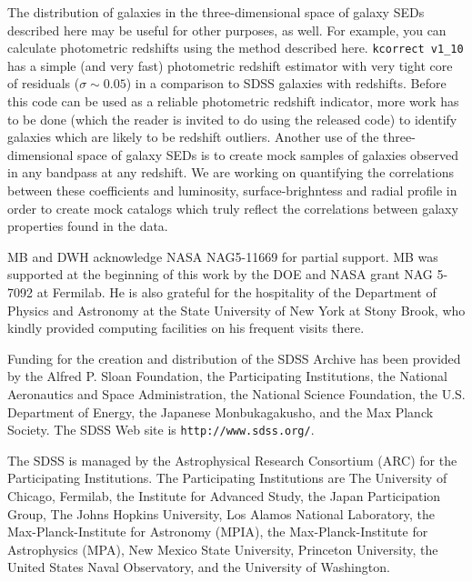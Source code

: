 \documentclass[10pt,preprint]{aastex}
\newcommand{\kversion}{{\tt v1\_10}}
\begin{document}
The distribution of galaxies in the three-dimensional space of galaxy
SEDs described here may be useful for other purposes, as well. For
example, you can calculate photometric redshifts using the method
described here. {\tt kcorrect \kversion} has a simple (and very fast)
photometric redshift estimator with very tight core of residuals
($\sigma \sim 0.05$) in a comparison to SDSS galaxies with redshifts.
Before this code can be used as a reliable photometric redshift
indicator, more work has to be done (which the reader is invited to do
using the released code) to identify galaxies which are likely to be
redshift outliers. Another use of the three-dimensional space of
galaxy SEDs is to create mock samples of galaxies observed in any
bandpass at any redshift. We are working on quantifying the
correlations between these coefficients and luminosity,
surface-brighntess and radial profile in order to create mock catalogs
which truly reflect the correlations between galaxy properties found
in the data. 

\acknowledgments

MB and DWH acknowledge NASA NAG5-11669 for partial support.  MB was
supported at the beginning of this work by the DOE and NASA grant NAG
5-7092 at Fermilab. He is also grateful for the hospitality of the
Department of Physics and Astronomy at the State University of New
York at Stony Brook, who kindly provided computing facilities on his
frequent visits there.

Funding for the creation and distribution of the SDSS Archive has been
provided by the Alfred P. Sloan Foundation, the Participating
Institutions, the National Aeronautics and Space Administration, the
National Science Foundation, the U.S. Department of Energy, the
Japanese Monbukagakusho, and the Max Planck Society. The SDSS Web site
is {\tt http://www.sdss.org/}.

The SDSS is managed by the Astrophysical Research Consortium (ARC) for
the Participating Institutions. The Participating Institutions are The
University of Chicago, Fermilab, the Institute for Advanced Study, the
Japan Participation Group, The Johns Hopkins University, Los Alamos
National Laboratory, the Max-Planck-Institute for Astronomy (MPIA),
the Max-Planck-Institute for Astrophysics (MPA), New Mexico State
University, Princeton University, the United States Naval Observatory,
and the University of Washington.
 
\begin{thebibliography}{DUM}

\end{thebibliography}

\newpage

%


\end{document}
